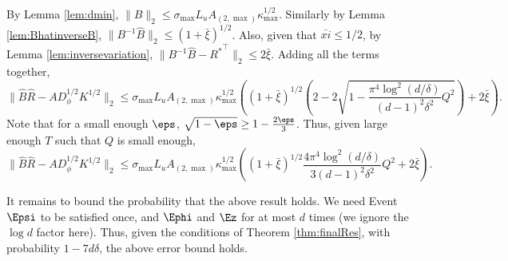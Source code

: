 By Lemma \ref{lem:dmin}, 
 $ \|B\|_2 \le \sigma_{\max}L_uA_{(2,\max)}\kappa_{\max}^{1/2}$. 
Similarly by Lemma \ref{lem:BhatinverseB}, $\| B^{-1}\hat{B}\|_2 \le (1+\bar{\xi})^{1/2}$. 
Also, given that $\bar{xi} \le 1/2$, by Lemma \ref{lem:inversevariation}, $\|B^{-1}\hat{B} -{R^*}^{\top}\|_2 \le 2\bar{\xi}$.
Adding all the terms together,
\[
\| \hat{B}\hat{R} - AD_{\phi}^{1/2}K^{1/2}\|_2 \le \sigma_{\max}L_uA_{(2,\max)}\kappa_{\max}^{1/2}\left((1+\bar{\xi})^{1/2}\left(  2 - 2\sqrt{1-\frac{\pi^4 \log^2(d/\delta)}{(d-1)^2\delta^2} Q^2}\right) + 2\bar{\xi}\right).
\] 
Note that for a small enough $\eps$, $\sqrt{1-\eps} \ge 1-\frac{2\eps}{3}$. Thus, given large enough $T$ such that $Q$ is small enough,
\[
\| \hat{B}\hat{R} - AD_{\phi}^{1/2}K^{1/2}\|_2 \le \sigma_{\max}L_uA_{(2,\max)}\kappa_{\max}^{1/2}\left((1+\bar{\xi})^{1/2}\frac{4\pi^4 \log^2(d/\delta)}{3(d-1)^2\delta^2} Q^2+ 2\bar{\xi}\right).
\]

It remains to bound the probability that the above result holds.
We need Event $\Epsi$ to be satisfied once, and $\Ephi$ and $\Ez$ for at most $d$ times (we ignore the $\log d$ factor here). 
Thus, given the conditions of Theorem \ref{thm:finalRes}, with probability $1-7d\delta$, the above error bound holds. 
